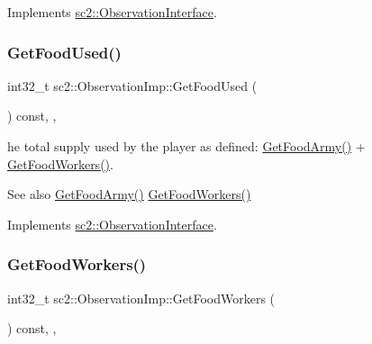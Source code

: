 Implements \hyperlink{classsc2_1_1_observation_interface_ac556f665e6920eb853711c1b7d4d54b3}{sc2\+::\+Observation\+Interface}.

\mbox{\label{classsc2_1_1_observation_imp_a5489d7a3c6095b29c82e835bb3eb2aba}} 
\subsubsection{\texorpdfstring{Get\+Food\+Used()}{GetFoodUsed()}}
{\footnotesize\ttfamily int32\+\_\+t sc2\+::\+Observation\+Imp\+::\+Get\+Food\+Used (\begin{DoxyParamCaption}{ }\end{DoxyParamCaption}) const\hspace{0.3cm}{\ttfamily [inline]}, {\ttfamily [final]}, {\ttfamily [virtual]}}

he total supply used by the player as defined\+: \hyperlink{classsc2_1_1_observation_imp_a97f6013fc1578cc1db1266d39edab7c4}{Get\+Food\+Army()} + \hyperlink{classsc2_1_1_observation_imp_a88f76eedeac5d81f608b68ca3ff69782}{Get\+Food\+Workers()}. \begin{DoxySeeAlso}{See also}
\hyperlink{classsc2_1_1_observation_imp_a97f6013fc1578cc1db1266d39edab7c4}{Get\+Food\+Army()} \hyperlink{classsc2_1_1_observation_imp_a88f76eedeac5d81f608b68ca3ff69782}{Get\+Food\+Workers()} 
\end{DoxySeeAlso}


Implements \hyperlink{classsc2_1_1_observation_interface_a77f230bd98b95599338c7788aee00d26}{sc2\+::\+Observation\+Interface}.

\mbox{\label{classsc2_1_1_observation_imp_a88f76eedeac5d81f608b68ca3ff69782}} 
\subsubsection{\texorpdfstring{Get\+Food\+Workers()}{GetFoodWorkers()}}
{\footnotesize\ttfamily int32\+\_\+t sc2\+::\+Observation\+Imp\+::\+Get\+Food\+Workers (\begin{DoxyParamCaption}{ }\end{DoxyParamCaption}) const\hspace{0.3cm}{\ttfamily [inline]}, {\ttfamily [final]}, {\ttfamily [virtual]}}

